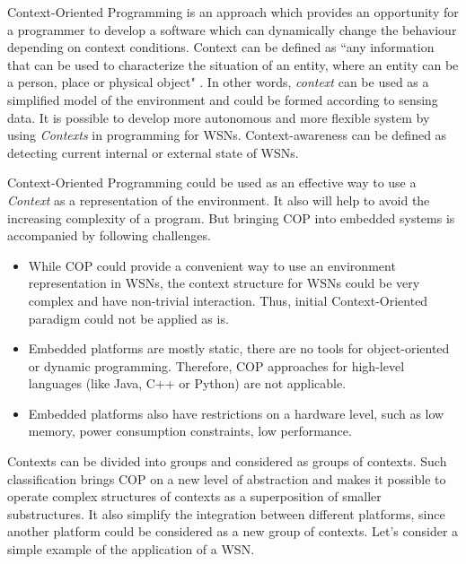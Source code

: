 \documentclass{ubicomp-ext}
\begin{document}
Context-Oriented Programming \cite{hirschfeld08} is an approach which provides an opportunity for a programmer to develop a software which can dynamically change the behaviour depending on context conditions. Context can be defined as ``any information that can be used to characterize the situation of an entity, where an entity can be a person, place or physical object" \cite{dey99}. In other words, \textit{context} can be used as a simplified model of the environment and could be formed according to sensing data. It is possible to develop more autonomous and more flexible system by using \textit{Contexts} in programming for WSNs. Context-awareness can be defined as detecting current internal or external state of WSNs.

Context-Oriented Programming could be used as an effective way to use a \textit{Context} as a representation of the environment. It also will help to avoid the increasing complexity of a program. But bringing COP into embedded systems is accompanied by following challenges.
\begin{itemize}\compresslist
\item
While COP could provide a convenient way to use an environment representation in WSNs, the context structure for WSNs could be very complex and have non-trivial interaction. Thus, initial Context-Oriented paradigm could not be applied as is.
\item
Embedded platforms are mostly static, there are no tools for object-oriented or dynamic programming. Therefore, COP approaches for high-level languages (like Java, C++ or Python) are not applicable. 
\item
Embedded platforms also have restrictions on a hardware level, such as low memory, power consumption constraints, low performance.
\end{itemize}
Contexts can be divided into groups and considered as groups of contexts. Such classification brings COP on a new level of abstraction and makes it possible to operate complex structures of contexts as a superposition of smaller substructures. It also simplify the integration between different platforms, since another platform could be considered as a new group of contexts. Let's consider a simple example of the application of a WSN. 
\end{document}
